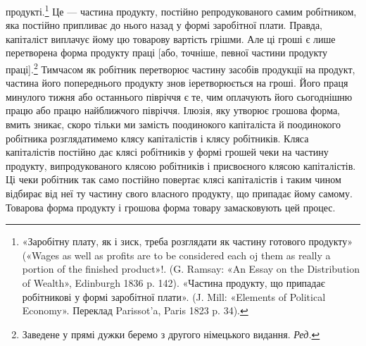 \parcont{}  %
продукті.\footnote{
«Заробітну плату, як і зиск, треба розглядати як частину готового
продукту» («Wages as well as profits are to be considered each oj
them as really a portion of the finished product»!. (G. Ramsay: «An Essay
on the Distribution of Wealth», Edinburgh 1836 p. 142). «Частина продукту,
що припадає робітникові у формі заробітної плати». (J. Mill:
«Elements of Political Economy». Переклад Parissot’a, Paris 1823 p. 34).
} Це — частина продукту, постійно репродукованого
самим робітником, яка постійно припливає до нього назад у
формі заробітної плати. Правда, капіталіст виплачує йому цю
товарову вартість грішми. Але ці гроші є лише перетворена форма
продукту праці [або, точніше, певної частини продукту праці].\footnote*{
Заведене у прямі дужки беремо з другого німецького видання. \emph{Ред.}
}
Тимчасом як робітник перетворює частину засобів продукції
на продукт, частина його попереднього продукту знов іеретворюється
на гроші. Його праця минулого тижня або останнього
півріччя є те, чим оплачують його сьогоднішню працю або працю
найближчого півріччя. Ілюзія, яку утворює грошова форма,
вмить зникає, скоро тільки ми замість поодинокого капіталіста
й поодинокого робітника розглядатимемо клясу капіталістів і
клясу робітників. Кляса капіталістів постійно дає клясі робітників
у формі грошей чеки на частину продукту, випродукованого
клясою робітників і присвоєного клясою капіталістів. Ці
чеки робітник так само постійно повертає клясі капіталістів і
таким чином відбирає від неї ту частину свого власного продукту,
що припадає йому самому. Товарова форма продукту і грошова
форма товару замасковують цей процес.

